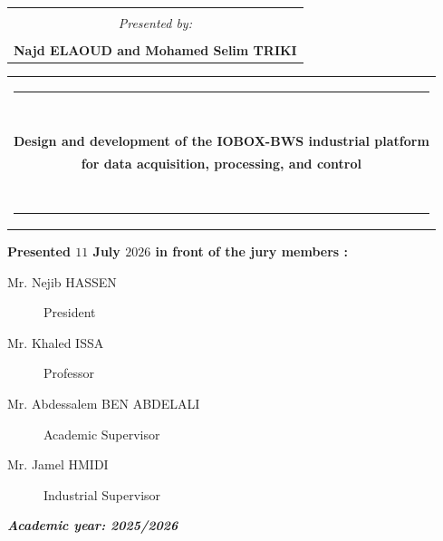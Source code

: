 \begin{titlepage}
\begin{center}
\begin{tabular}{lcr}
\multicolumn{3}{c}{\emph{   }}  \\

\multicolumn{3}{c}{\emph{ Presented by:}}\\
\multicolumn{3}{c}{\emph{   }}  \\
\multicolumn{3}{c}{\textbf{ {\huge Najd ELAOUD and Mohamed Selim TRIKI}}}\\
\end{tabular}
\vspace*{0.05cm}

\begin{tabular}{lcr}
	\multicolumn{3}{c}{\rule{\linewidth}{4pt}}\\
	\multicolumn{3}{c}{\huge  ~}\\
	\multicolumn{3}{c}{\textbf{\large{Design and development of the IOBOX-BWS industrial platform}}} \\
 	\multicolumn{3}{c}{\textbf{\large{  for data acquisition, processing, and control}}}\\
	\multicolumn{3}{c}{\huge  ~} \\
	\multicolumn{3}{c}{\rule{\linewidth}{4pt}}
\end{tabular}


\textbf{Presented $11$ July $2026$ in front of the jury members :}
\vspace*{1cm}
\begin{normalsize}
	\begin{description}
	\item [Mr. Nejib HASSEN \hspace{0.75cm}  ]\hfill  President 
	\item [Mr. Khaled ISSA   \hspace{0.75cm}   ] \hfill Professor
	\item [Mr. Abdessalem BEN ABDELALI   \hspace{0.75cm} ] \hfill  Academic Supervisor 
	\item [Mr. Jamel HMIDI   \hspace{0.75cm}] \hfill  Industrial Supervisor 
	\end{description}
\end{normalsize}

\vfill
\hrulefill \small{\textbf{\textit{\hspace*{0.3cm} Academic year: 2025/2026\hspace*{0.3cm}}}} \hrulefill
\end{center}


\end{titlepage}




